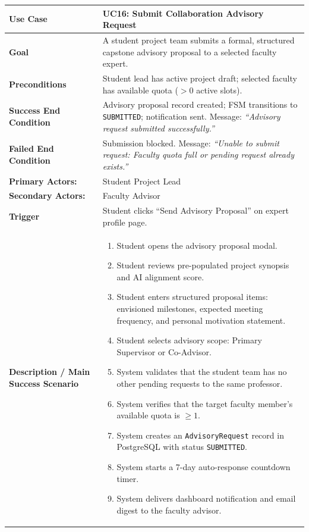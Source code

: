 \begin{table}[H]
\centering
\small
\begin{tabularx}{\textwidth}{|l|X|}
\hline
\rowcolor{lightgray!40} \textbf{Use Case} & \textbf{UC16: Submit Collaboration Advisory Request} \\ \hline
\textbf{Goal} & A student project team submits a formal, structured capstone advisory proposal to a selected faculty expert. \\ \hline
\textbf{Preconditions} & Student lead has active project draft; selected faculty has available quota ($>0$ active slots). \\ \hline
\textbf{Success End Condition} & Advisory proposal record created; FSM transitions to \texttt{SUBMITTED}; notification sent. Message: \textit{``Advisory request submitted successfully.''} \\ \hline
\textbf{Failed End Condition} & Submission blocked. Message: \textit{``Unable to submit request: Faculty quota full or pending request already exists.''} \\ \hline
\textbf{Primary Actors:} & Student Project Lead \\
\textbf{Secondary Actors:} & Faculty Advisor \\ \hline
\textbf{Trigger} & Student clicks ``Send Advisory Proposal'' on expert profile page. \\ \hline
\textbf{Description / Main Success Scenario} &
\begin{enumerate}[leftmargin=*]
    \item Student opens the advisory proposal modal.
    \item Student reviews pre-populated project synopsis and AI alignment score.
    \item Student enters structured proposal items: envisioned milestones, expected meeting frequency, and personal motivation statement.
    \item Student selects advisory scope: Primary Supervisor or Co-Advisor.
    \item System validates that the student team has no other pending requests to the same professor.
    \item System verifies that the target faculty member's available quota is $\ge 1$.
    \item System creates an \texttt{AdvisoryRequest} record in PostgreSQL with status \texttt{SUBMITTED}.
    \item System starts a 7-day auto-response countdown timer.
    \item System delivers dashboard notification and email digest to the faculty advisor.

\end{enumerate}
\end{tabularx}
\end{table}
